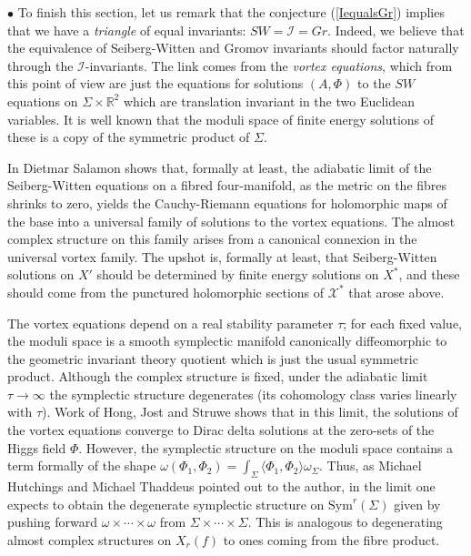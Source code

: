 \documentclass[10pt]{article}
\newcommand{\rr}{\mathbb{R}}
\newcommand{\Sym}{\mathrm{Sym}}
\begin{document}
\vspace{0.3cm}

\noindent $\bullet$  To finish this section, let us remark that the conjecture
(\ref{IequalsGr}) implies that we have a \emph{triangle} of equal
invariants:  $SW = \mathcal{I} = Gr$.  Indeed, we believe that the
equivalence of Seiberg-Witten and Gromov invariants should factor
naturally through the $\mathcal{I}$-invariants.  The link comes from the
\emph{vortex equations}, which from this point of view are just the
equations for solutions $(A, \Phi)$ to the $SW$ equations on $\Sigma
\times \rr^2$ 
which are translation invariant in the two Euclidean variables.  It is
well known that the moduli space of finite energy solutions of these
is a copy of the symmetric product of $\Sigma$.

\vspace{0.2cm}

\noindent  In \cite{Salamon}
Dietmar Salamon shows that, formally at least, the adiabatic limit of
the Seiberg-Witten equations on a fibred four-manifold, as the metric
on the fibres shrinks to zero, yields the Cauchy-Riemann equations for
holomorphic maps of the base into a universal family of solutions to
the vortex equations.  
The almost complex structure on this family arises from a canonical
connexion in
the universal vortex family.  The upshot is, formally at least, that
Seiberg-Witten solutions on $X'$ should be determined by finite energy
solutions on $X^*$, and these should come from the punctured
holomorphic sections of $\mathcal{X}^*$ that arose above.  

\vspace{0.2cm}

\noindent The vortex
equations depend on a real stability parameter $\tau$; for each fixed
value, the moduli space is a smooth symplectic manifold canonically
diffeomorphic to the geometric invariant theory quotient which is just
the usual symmetric product.  Although the complex structure is fixed, under
the adiabatic limit $\tau \rightarrow \infty$ the symplectic
structure degenerates (its cohomology class  varies linearly with
$\tau$).  Work of Hong,
Jost and Struwe \cite{Jostetal}
shows that in this limit, the solutions of the vortex equations
converge to Dirac delta solutions at the zero-sets of the Higgs field
$\Phi$.  However, the symplectic structure on the moduli space
contains a term
formally of the shape $\omega(\Phi_1, \Phi_2) = \int_{\Sigma} \langle
\Phi_1, \Phi_2 \rangle \omega_{\Sigma}$.  Thus, as Michael Hutchings
and Michael Thaddeus pointed out to the author, in the limit one
expects to obtain the degenerate symplectic structure on $\Sym^r
(\Sigma)$ given by pushing forward $\omega \times \cdots \times
\omega$ from $\Sigma \times \cdots \times \Sigma$.  This is analogous
to degenerating almost complex structures on $X_r(f)$ to ones coming
from the fibre product. 
\end{document}
